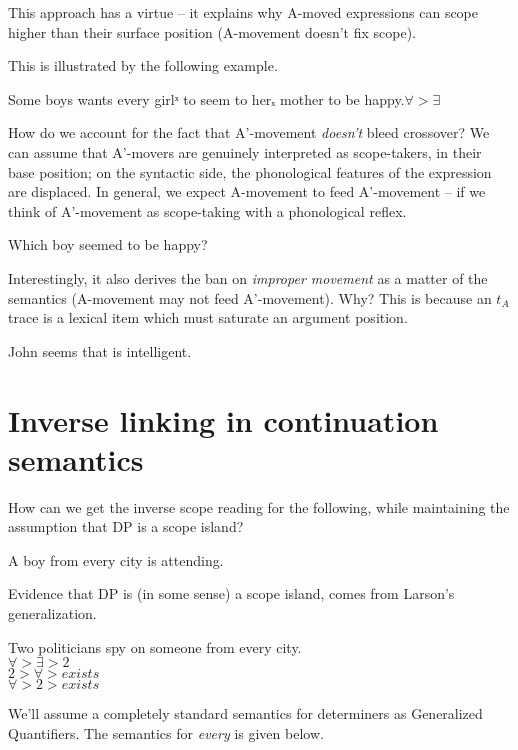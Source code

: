 \documentclass[nols,twoside,nofonts,nobib,nohyper]{tufte-handout}
\begin{document}
This approach has a virtue -- it explains why A-moved expressions can scope
higher than their surface position (A-movement doesn't fix scope).

This is illustrated by the following example.

\ex
Some boys wants every girl$ˣ$ to seem to her$ₓ$ mother to be happy.\hfill$∀ > ∃$
\xe

How do we account for the fact that A'-movement \textit{doesn't} bleed
crossover? We can assume that A'-movers are genuinely interpreted as
scope-takers, in their base position; on the syntactic side, the phonological
features of the expression are displaced.
In general, we expect A-movement to feed A'-movement – if we think of
A'-movement as scope-taking with a phonological reflex.

\ex
Which boy seemed to be happy?
\xe

Interestingly, it also derives the ban on \textit{improper movement} as a matter
of the semantics (A-movement may not feed A'-movement). Why? This is because an
$t_{A}$ trace is a lexical item which must saturate an argument position.

\ex
\ljudge{*}John seems that is intelligent.
\xe

\section{Inverse linking in continuation semantics}

How can we get the inverse scope reading for the following, while maintaining
the assumption that DP is a scope island?

\ex
A boy from every city is attending.\label{ex:inverse}
\xe

Evidence that DP is (in some sense) a scope island, comes from Larson's
generalization.

\ex
Two politicians spy on someone from every city.\\
\phantom{,}\hfill\cmark $\forall > \exists > 2$\\
\phantom{,}\hfill\cmark $2 > \forall > exists$\\
\phantom{,}\hfill\xmark $\forall > 2 > exists$
\xe


We'll assume a completely standard semantics for determiners as Generalized
Quantifiers. The semantics for \textit{every} is given below.
\end{document}
